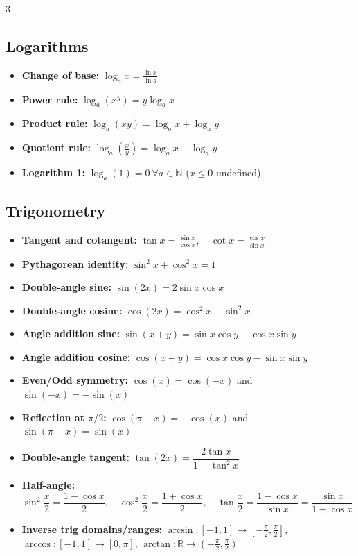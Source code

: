 \begin{multicols}{3}
\subsection*{Logarithms}
\begin{itemize}[noitemsep, topsep=0pt, leftmargin=*]
\item \textbf{Change of base:} $\log_a x=\frac{\ln x}{\ln a}$
\item \textbf{Power rule:} $\log_a(x^y)=y\log_a x$
\item \textbf{Product rule:} $\log_a(xy)=\log_a x+\log_a y$
\item \textbf{Quotient rule:} $\log_a\left(\frac xy\right)=\log_a x-\log_a y$
\item \textbf{Logarithm 1:} $\log_a\left(1\right)=0 \ \forall a \in \mathbb{N}$ ($x \leq 0$ undefined)
\end{itemize}

\subsection*{Trigonometry}
\begin{itemize}[noitemsep, topsep=0pt, leftmargin=*]
\item \textbf{Tangent and cotangent:} $\tan x=\frac{\sin x}{\cos x},\quad \cot x=\frac{\cos x}{\sin x}$
\item \textbf{Pythagorean identity:} $\sin^2x+\cos^2x=1$
\item \textbf{Double-angle sine:} $\sin(2x)=2\sin x\cos x$
\item \textbf{Double-angle cosine:} $\cos(2x)=\cos^2x-\sin^2x$
\item \textbf{Angle addition sine:} $\sin(x+y)=\sin x\cos y+\cos x\sin y$
\item \textbf{Angle addition cosine:} $\cos(x+y)=\cos x\cos y-\sin x\sin y$
\item \textbf{Even/Odd symmetry:} $\cos(x)=\cos(-x)$ and $\sin(-x)=-\sin(x)$
\item \textbf{Reflection at $\pi/2$:} $\cos(\pi-x)=-\cos(x)$ and $\sin(\pi-x)=\sin(x)$
\item \textbf{Double-angle tangent:} $\tan(2x)=\dfrac{2\tan x}{1-\tan^2x}$
\item \textbf{Half-angle:} $\sin^2\!\dfrac x2=\dfrac{1-\cos x}2,\quad \cos^2\!\dfrac x2=\dfrac{1+\cos x}2,\quad \tan\dfrac x2=\dfrac{1-\cos x}{\sin x}=\dfrac{\sin x}{1+\cos x}$
\item \textbf{Inverse trig domains/ranges:} $\arcsin:[-1,1]\to[-\frac\pi2,\frac\pi2]$, $\arccos:[-1,1]\to[0,\pi]$, $\arctan:\mathbb{R}\to(-\frac\pi2,\frac\pi2)$
\end{itemize}


\end{multicols}
